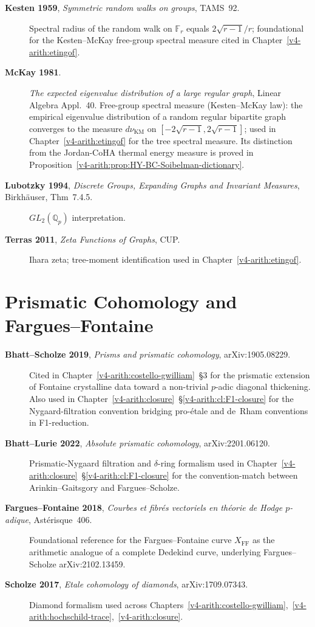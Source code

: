 \begin{description}
\item[\textbf{Kesten 1959}, \emph{Symmetric random walks on groups},
TAMS~92.] Spectral radius of the random walk on \(\mathbb{F}_{r}\)
equals \(2\sqrt{r-1}/r\); foundational for the Kesten--McKay
free-group spectral measure cited in
Chapter~\ref{v4-arith:etingof}.
\item[\textbf{McKay 1981}.] \emph{The expected eigenvalue
distribution of a large regular graph}, Linear Algebra Appl.~40.
Free-group spectral measure (Kesten--McKay law): the empirical
eigenvalue distribution of a random regular bipartite graph
converges to the measure \(d\nu_{\mathrm{KM}}\) on \([-2\sqrt{r-1},
2\sqrt{r-1}]\); used in Chapter~\ref{v4-arith:etingof}
for the tree spectral measure. Its distinction from the Jordan-CoHA
thermal energy measure is proved in
Proposition~\ref{v4-arith:prop:HY-BC-Soibelman-dictionary}.
\item[\textbf{Lubotzky 1994}, \emph{Discrete Groups, Expanding
Graphs and Invariant Measures}, Birkh\"auser, Thm~7.4.5.] \(GL_{2}(\mathbb{Q}_{p})\)
interpretation.
\item[\textbf{Terras 2011}, \emph{Zeta Functions of Graphs}, CUP.]
Ihara zeta; tree-moment identification used in
Chapter~\ref{v4-arith:etingof}.
\end{description}

\section{Prismatic Cohomology and Fargues--Fontaine}
\label{v4-arith:app:A:prismatic}

\begin{description}
\item[\textbf{Bhatt--Scholze 2019}, \emph{Prisms and prismatic
cohomology}, arXiv:1905.08229.] Cited in
Chapter~\ref{v4-arith:costello-gwilliam}~\S3 for the prismatic
extension of Fontaine crystalline data toward a non-trivial
\(p\)-adic diagonal thickening. Also used in
Chapter~\ref{v4-arith:closure}~\S\ref{v4-arith:cl:F1-closure} for the
Nygaard-filtration convention bridging pro-\'etale and de~Rham
conventions in F1-reduction.
\item[\textbf{Bhatt--Lurie 2022}, \emph{Absolute prismatic
cohomology}, arXiv:2201.06120.] Prismatic-Nygaard filtration and
\(\delta\)-ring formalism used in
Chapter~\ref{v4-arith:closure}~\S\ref{v4-arith:cl:F1-closure}
for the convention-match between Arinkin--Gaitsgory and
Fargues--Scholze.
\item[\textbf{Fargues--Fontaine 2018}, \emph{Courbes et fibr\'es
vectoriels en th\'eorie de Hodge \(p\)-adique}, Ast\'erisque~406.]
Foundational reference for the Fargues--Fontaine curve
\(X_{\mathrm{FF}}\) as the arithmetic analogue of a complete
Dedekind curve, underlying Fargues--Scholze arXiv:2102.13459.
\item[\textbf{Scholze 2017}, \emph{Etale cohomology of diamonds},
arXiv:1709.07343.] Diamond formalism used across
Chapters~\ref{v4-arith:costello-gwilliam},~\ref{v4-arith:hochschild-trace},~\ref{v4-arith:closure}.
\end{description}

